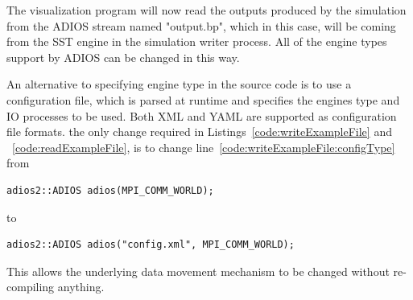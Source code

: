\documentclass[x11names,table,xcdraw,graybox]{svmult}
\begin{document}
The visualization program will now read the outputs produced by the simulation from the ADIOS stream named "output.bp", which in this case, will be coming from the SST engine in the simulation writer process. All of the engine types support by ADIOS can be changed in this way.

An alternative to specifying engine type in the source code is to use a configuration file,  which is parsed at runtime and specifies the engines type and IO processes to be used. Both XML and YAML are supported as configuration file formats.
the only change required in Listings~\ref{code:writeExampleFile} and ~\ref{code:readExampleFile}, is to change line~\ref{code:writeExampleFile:configType}
from
\begin{lstlisting}[numbers=none]
adios2::ADIOS adios(MPI_COMM_WORLD);
\end{lstlisting}
to
\begin{lstlisting}[numbers=none]
adios2::ADIOS adios("config.xml", MPI_COMM_WORLD);
\end{lstlisting}

This allows the underlying data movement mechanism to be changed without re-compiling anything.

%
%

%
%
%
\end{document}
